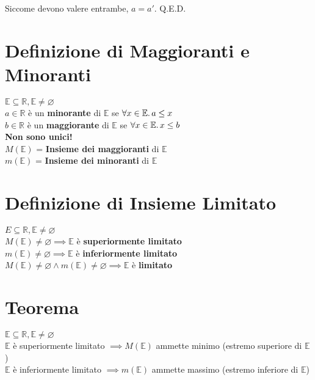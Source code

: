 \documentclass[a4paper, twoside, italian, 11pt]{book}
\newcommand{\R}{\mathbb{R}}
\newcommand{\E}{\mathbb{E}}
\let\emptyset\varnothing
\begin{document}
\noindent
Siccome devono valere entrambe, $a = a'$. Q.E.D.



\section{Definizione di Maggioranti e Minoranti}

\noindent
$\E \subseteq \R, \E \neq \emptyset$ \\

$a \in \R$ è un \textbf{minorante} di $\E$ se $\forall x \in \E \ldotp a \leq x$ \\

$b \in \R$ è un \textbf{maggiorante} di $\E$ se $\forall x \in \E \ldotp x \leq b$ \\

\noindent
\textbf{Non sono unici!} \\

\noindent
$M(\E)$ = \textbf{Insieme dei maggioranti} di $\E$\\
$m(\E)$ = \textbf{Insieme dei minoranti} di $\E$



\section{Definizione di Insieme Limitato}

\noindent
$E \subseteq \R, \E \neq \emptyset$ \\

$M(\E) \neq \emptyset \implies \E$ è \textbf{superiormente limitato} \\
\indent
$m(\E) \neq \emptyset \implies \E$ è \textbf{inferiormente limitato} \\
\indent
$M(\E) \neq \emptyset \land m(\E) \neq \emptyset \implies \E$ è \textbf{limitato}



\section{Teorema}

\noindent
$\E \subseteq \R, \E \neq \emptyset$ \\

\noindent
$\E$ è superiormente limitato $\implies M(\E)$ ammette minimo (estremo superiore di $\E$) \\

\noindent
$\E$ è inferiormente limitato $\implies m(\E)$ ammette massimo (estremo inferiore di $\E$)
\end{document}
